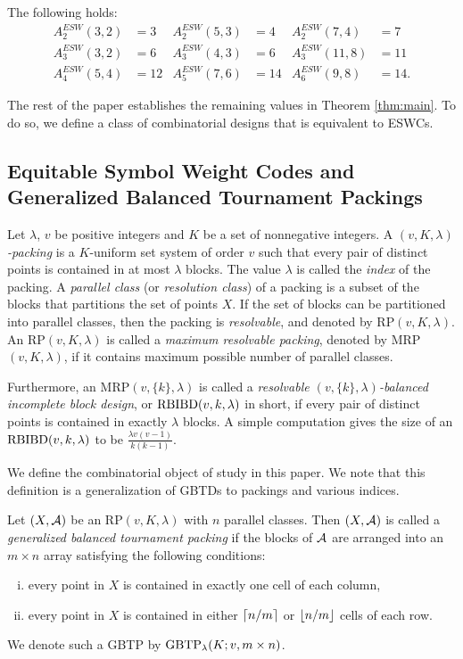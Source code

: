 \documentclass[draft, 11pt]{article}
\begin{document}
\begin{proposition}\label{prop:small}
The following holds:
\begin{align*}
A_2^{ESW}(3,2) &=3     &     A_2^{ESW}(5,3) &=4     &     A_2^{ESW}(7,4) &=7\\
A_3^{ESW}(3,2) &=6     &     A_3^{ESW}(4,3) &=6     &     A_3^{ESW}(11,8) &=11\\
A_4^{ESW}(5,4) &=12   &     A_5^{ESW}(7,6) &=14   &     A_6^{ESW}(9,8) &=14.
\end{align*}
\end{proposition}
The rest of the paper establishes the remaining values %
in Theorem \ref{thm:main}. 
To do so, we define a class of combinatorial designs that is equivalent to ESWCs. 



\subsection{Equitable Symbol Weight Codes and Generalized Balanced Tournament Packings}
 Let $\lambda$, $v$ be positive integers and $K$ be a set of nonnegative integers.
 A {\em $(v,K,\lambda)$-packing} is a $K$-uniform set
 system of order $v$ such that every pair of distinct points is contained in at most $\lambda$ blocks. 
 The value $\lambda$ is called the {\em index} of the packing.
 A {\em parallel class} (or {\em resolution class}) of a packing is a subset of the blocks that partitions the
 set of points $X$. If the set of blocks can be partitioned into
 parallel classes, then the packing is {\em resolvable}, and denoted
 by RP$(v,K,\lambda)$. An RP$(v,K,\lambda)$ is called a {\em maximum  resolvable packing}, denoted
 by MRP$(v,K,\lambda)$, if it contains maximum possible number of
 parallel classes.

 Furthermore, an MRP$(v,\{k\},\lambda)$ is called a {\em resolvable $(v,\{k\},\lambda)$-balanced incomplete block design}, or ${\rm RBIBD}(v,k,\lambda)$ in short, if every pair of distinct points
 is contained in exactly $\lambda$ blocks. A simple computation gives
  the size of an ${\rm RBIBD}(v,k,\lambda)$ to be
 $\frac{\lambda v(v-1)}{k(k-1)}$.
 
 We define the combinatorial object of study in this paper. 
 We note that this definition is a generalization of GBTDs to packings
 and various indices.
                                                        
 \begin{definition}
 Let $(X,\mathcal A)$ be an RP$(v,K,\lambda)$ with $n$ parallel classes.
 Then $(X,\mathcal A)$ is called a {\em generalized balanced tournament packing}
 if the blocks of $\mathcal A$ are arranged into an $m\times n$ array satisfying the
 following conditions:
 \begin{enumerate}[(i)]
 \item every point in $X$ is contained in exactly one cell of each column,
 \item every point in $X$ is contained in either  $\left\lceil{n/m}\right\rceil$ or $\left\lfloor{n/m}\right\rfloor$ cells of each row.
 \end{enumerate}
 We denote such a GBTP by $\textrm{GBTP}_\lambda(K;v,m\times n)$.
 \end{definition}
\end{document}
